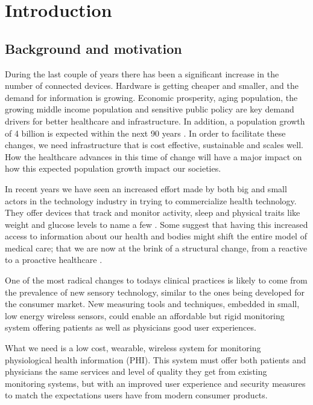 \section{Introduction} 

\label{sec:introduction}

\subsection{Background and motivation} 

\label{sub:background_and_motivation}

During the last couple of years there has been a significant increase in the number of connected devices. Hardware is getting cheaper and smaller, and the demand for information is growing. Economic prosperity, aging population, the growing middle income population and sensitive public policy are key demand drivers for better healthcare and infrastructure. In addition, a population growth of 4 billion is expected within the next 90 years \cite{WPP2015:Methodology}. In order to facilitate these changes, we need infrastructure that is cost effective, sustainable and scales well. How the healthcare advances in this time of change will have a major impact on how this expected population growth impact our societies. 

In recent years we have seen an increased effort made by both big and small actors in the technology industry in trying to commercialize health technology. They offer devices that track and monitor activity, sleep and physical traits like weight and glucose levels to name a few \cite{fitbit, fitbit:scale:6}. Some suggest that having this increased access to information about our health and bodies might shift the entire model of medical care; that we are now at the brink of a structural change, from a reactive to a proactive healthcare \cite{lynnechou:7, helsit:kari:8, johnmaeda:9, deloitte:healthcare3:0:10}.

One of the most radical changes to todays clinical practices is likely to come from the prevalence of new sensory technology, similar to the ones being developed for the consumer market. New measuring tools and techniques, embedded in small, low energy wireless sensors, could enable an affordable but rigid monitoring system offering patients as well as physicians good user experiences. 

What we need is a low cost, wearable, wireless system for monitoring physiological health information (PHI). This system must offer both patients and physicians the same services and level of quality they get from existing monitoring systems, but with an improved user experience and security measures to match the expectations users have from modern consumer products. 

